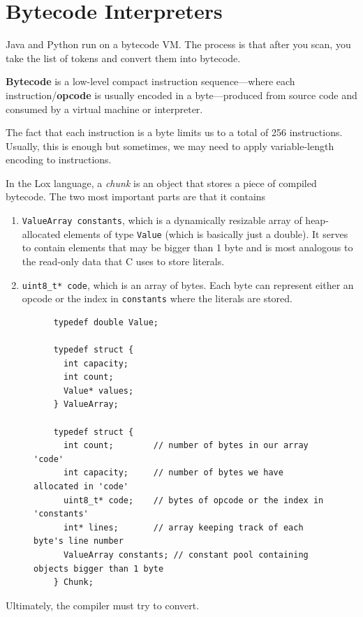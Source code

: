 \section{Bytecode Interpreters} 

  Java and Python run on a bytecode VM. The process is that after you scan, you take the list of tokens and convert them into bytecode. 

  \begin{definition}[Bytecode]
    \label{def:bytecode}
    \textbf{Bytecode} is a low-level compact instruction sequence---where each instruction/\textbf{opcode} is usually encoded in a byte---produced from source code and consumed by a virtual machine or interpreter. 
  \end{definition} 

  The fact that each instruction is a byte limits us to a total of 256 instructions. Usually, this is enough but sometimes, we may need to apply variable-length encoding to instructions.  

  \begin{example}
    \label{ex:lox-implementation-of-bytecode-chunks}
    In the Lox language, a \textit{chunk} is an object that stores a piece of compiled bytecode. The two most important parts are that it contains 
    \begin{enumerate}
      \item \texttt{ValueArray constants}, which is a dynamically resizable array of heap-allocated elements of type \texttt{Value} (which is basically just a double). It serves to contain elements that may be bigger than 1 byte and is most analogous to the read-only data that C uses to store literals. 
      \item \texttt{uint8\_t* code}, which is an array of bytes. Each byte can represent either an opcode or the index in \texttt{constants} where the literals are stored. 
    \end{enumerate}

    \begin{figure}[H]
      \centering 
      \begin{lstlisting}
	typedef double Value;

	typedef struct {
	  int capacity; 
	  int count; 
	  Value* values;
	} ValueArray;

	typedef struct {
	  int count; 		// number of bytes in our array 'code'
	  int capacity; 	// number of bytes we have allocated in 'code'
	  uint8_t* code; 	// bytes of opcode or the index in 'constants'
	  int* lines;		// array keeping track of each byte's line number
	  ValueArray constants; // constant pool containing objects bigger than 1 byte
	} Chunk; 
      \end{lstlisting}
      \caption{} 
      \label{fig:lox_chunk}
    \end{figure} 

    Ultimately, the compiler must try to convert. 
  \end{example}

